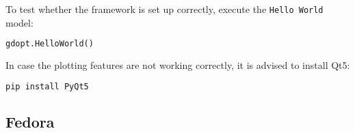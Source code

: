 \documentclass[12pt]{article}
\begin{document}
\begin{mdframed}[backgroundcolor=gray!10, roundcorner=10pt,
		linewidth=1pt]
	To test whether the framework is set up correctly, execute the \texttt{Hello World} model:
	\begin{lstlisting}[language=python]
gdopt.HelloWorld()
\end{lstlisting}

	In case the plotting features are not working correctly, it is advised to install Qt5:

	\begin{lstlisting}[language=bash]
pip install PyQt5
\end{lstlisting}

\end{mdframed}

\newpage

\subsection{Fedora}
\end{document}
